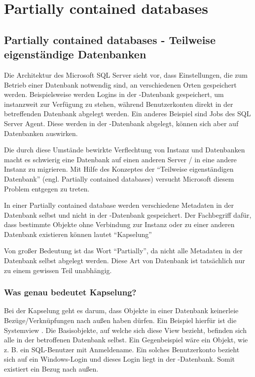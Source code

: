   \chapter{Partially contained databases}
  \chaptertoc{}
  \cleardoubleevenpage
    \section{Partially contained databases - Teilweise eigenständige
    Datenbanken} 
      Die Architektur des Microsoft SQL Server sieht vor, dass Einstellungen,
      die zum Betrieb einer Datenbank notwendig sind, an verschiedenen Orten
      gespeichert werden. Beispielsweise werden Logins in der
      -Datenbank gespeichert, um instanzweit zur Verfügung zu
      stehen, während Benutzerkonten direkt in der betreffenden Datenbank
      abgelegt werden. Ein anderes Beispiel sind Jobs des SQL Server Agent.
      Diese werden in der -Datenbank abgelegt, können sich aber
      auf Datenbanken auswirken.
      
      Die durch diese Umstände bewirkte Verflechtung von Instanz und Datenbanken
      macht es schwierig eine Datenbank auf einen anderen Server / in eine
      andere Instanz zu migrieren. Mit Hilfe des Konzeptes der
      \enquote{Teilweise eigenständigen Datenbank} (engl. Partially contained
      databases) versucht Microsoft diesem Problem entgegen zu treten.

      In einer Partially contained database werden verschiedene Metadaten
      in der Datenbank selbst und nicht in der -Datenbank
      gespeichert. Der Fachbegriff dafür, dass bestimmte Objekte ohne
      Verbindung zur Instanz oder zu einer anderen Datenbank existieren können
      lautet \enquote{Kapselung}
      \begin{merke}
        Von großer Bedeutung ist das Wort \enquote{Partially}, da nicht alle
        Metadaten in der Datenbank selbst abgelegt werden. Diese Art von
        Datenbank ist tatsächlich nur zu einem gewissen Teil unabhängig.
      \end{merke}
      \subsection{Was genau bedeutet Kapselung?}
        Bei der Kapselung geht es darum, dass Objekte in einer Datenbank
        keinerleie Bezüge/Verknüpfungen nach außen haben dürfen. Ein Beispiel
        hierfür ist die Systemview . Die Basisobjekte,
        auf welche sich diese View bezieht, befinden sich alle in der
        betroffenen Datenbank selbst. Ein Gegenbeispiel wäre ein Objekt, wie
        z. B. ein SQL-Benutzer mit Anmeldename. Ein solches Benutzerkonto
        bezieht sich auf ein Windows-Login und dieses Login liegt in der
        -Datenbank. Somit existiert ein Bezug nach außen.
        
